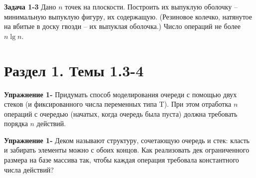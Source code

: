 \documentclass[a4paper,11pt]{article}
\begin{document}
\textbf{Задача 1-3} Дано $n$ точек на плоскости. Построить их выпуклую оболочку -- минимальную выпуклую фигуру, их содержащую. (Резиновое колечко, натянутое на вбитые в доску гвозди -- их выпуклая оболочка.) Число операций не более $n \lg n$.

\section*{Раздел 1. Темы 1.3-4}

\textbf{Упражнение 1-} Придумать способ моделирования очереди с помощью двух стеков (и фиксированного числа переменных типа T). При этом отработка $n$ операций с очередью (начатых, когда очередь была пуста) должна требовать порядка $n$ действий.

\textbf{Упражнение 1-} Деком называют структуру, сочетающую очередь и стек: класть и забирать элементы можно с обоих концов. Как реализовать дек ограниченного размера на базе массива так, чтобы каждая операция требовала константного числа действий?
\end{document}
